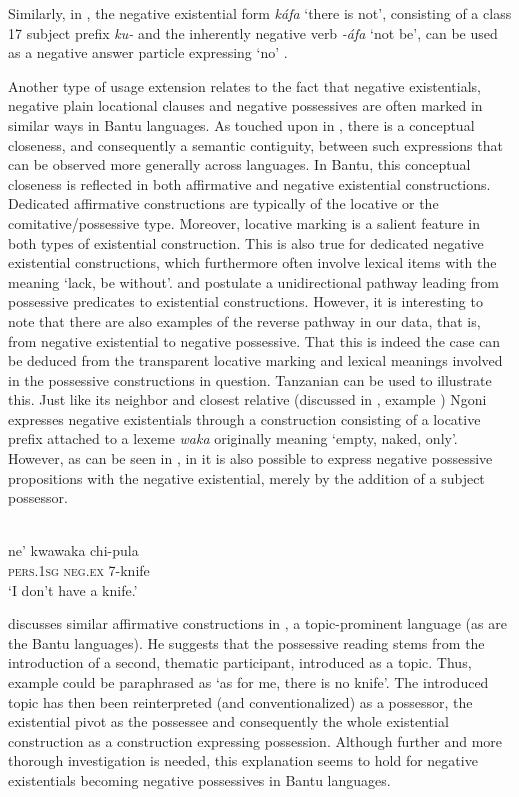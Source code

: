 \documentclass[output=paper,draft,draftmode,colorlinks,citecolor=brown]{langscibook}
\begin{document}
Similarly, in , the negative existential form \textit{káfa}
`there is not', consisting of a class 17 subject prefix \textit{ku-} and
the inherently negative verb \textit{-áfa} `not be', can be used as a negative
answer particle expressing `no' \citep[30]{Meeussen1952}.

Another type of usage extension relates to the fact that negative
existentials, negative plain locational clauses and negative possessives
are often marked in similar ways in Bantu languages. As touched upon in , there is a conceptual closeness, and
consequently a semantic contiguity, between such expressions that can be
observed more generally across languages. In Bantu, this conceptual
closeness is reflected in both affirmative and negative existential
constructions. Dedicated affirmative constructions are typically of the
locative or the comitative\slash possessive type. Moreover, locative marking is a
salient feature in both types of existential construction. This is also
true for dedicated negative existential constructions, which furthermore
often involve lexical items with the meaning `lack, be without'.
\citet{Heine1997} and \citet[241--242]{HeineKuteva2002} postulate a
unidirectional pathway leading from possessive predicates to existential
constructions. However, it is interesting to note that there are also
examples of the reverse pathway in our data, \textemdash that is, from negative
existential to negative possessive. That this is indeed the case can be
deduced from the transparent locative marking and lexical meanings involved
in the possessive constructions in question. Tanzanian  can be
used to illustrate this. Just like its neighbor and closest relative
 (discussed in , example
) Ngoni expresses negative existentials through a
construction consisting of a locative prefix attached to a lexeme
\textit{waka} originally meaning `empty, naked, only'. However, as can be
seen in , in  it is also possible to express
negative possessive propositions with the negative existential, merely by
the addition of a subject possessor.
%

\ea\label{ex:ngoni-knife} \\
\gll ne' kwawaka chi-pula\\ \textsc{pers.1sg}
\textsc{neg.ex} 7-knife\\
\glt 	`I don't have a knife.'
\z

%
\citet{Koch2012} discusses similar affirmative constructions in
, a to\-pic-pro\-mi\-nent language (as are the Bantu
languages). He suggests that the possessive reading stems from the
introduction of a second, thematic participant, introduced as a topic.
Thus, example  could be paraphrased as `as for me, there is no knife'. The
introduced topic has then been reinterpreted (and conventionalized) as a
possessor, the existential pivot as the possessee and consequently the
whole existential construction as a construction expressing possession.
Although further and more thorough investigation is needed, this
explanation seems to hold for negative existentials becoming negative
possessives in Bantu languages.
\end{document}
